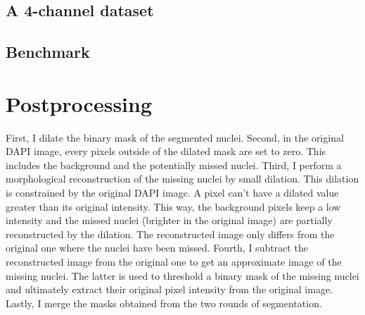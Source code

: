 \subsection{A 4-channel dataset}

\subsection{Benchmark}


\section{Postprocessing}


First, I dilate the binary mask of the segmented nuclei.
Second, in the original DAPI image, every pixels outside of the dilated mask are set to zero.
This includes the background and the potentially missed nuclei.
Third, I perform a morphological reconstruction of the missing nuclei by small dilation.
This dilation is constrained by the original DAPI image.
A pixel can't have a dilated value greater than its original intensity.
This way, the background pixels keep a low intensity and the missed nuclei (brighter in the original image) are partially reconstructed by the dilation.
The reconstructed image only differs from the original one where the nuclei have been missed.
Fourth, I subtract the reconstructed image from the original one to get an approximate image of the missing nuclei.
The latter is used to threshold a binary mask of the missing nuclei and ultimately extract their original pixel intensity from the original image.
Lastly, I merge the masks obtained from the two rounds of segmentation.

